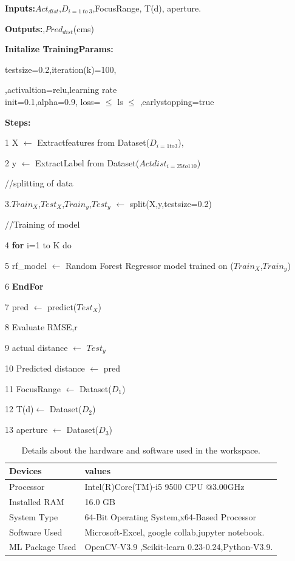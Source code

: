\documentclass[sn-mathphys]{sn-jnl}%
\theoremstyle{thmstyleone}%
\theoremstyle{thmstyletwo}%
\theoremstyle{thmstylethree}%
\begin{document}
\begin{algorithm}
\caption{Predict\textunderscore Distance\textunderscore from Tenengrad score .}
\label{alg:Alg2}
\textbf{Inputs:}$Act_{dist}$,$D_{i=1 \ to \ 3}$,Focus\textunderscore Range,
T(d), aperture. 

\textbf{Outputs:},$Pred_{dist}$(cms)

\textbf{Initalize TrainingParams:}

test\textunderscore size=0.2,iteration(k)=100,

,activaltion=relu,learning rate\textunderscore\\ init=0.1,alpha=0.9, loss= $\leq$ ls $\leq$ ,early\textunderscore stopping=true
 
\textbf{Steps:}

	1 X $\leftarrow$ Extract\textunderscore features \textunderscore  from \textunderscore Dataset($D_{i=1 to 3}$),
	
	2 y $\leftarrow$ Extract\textunderscore Label from \textunderscore Dataset($Actdist_{i=25 to 110}$) 
	
		//splitting of data
		
	3.$Train_{X}$,$Test_{X}$,$Train_{y}$,$Test_{y}$ $\leftarrow$ split(X,y,test\textunderscore size=0.2)

	//Training of model
	
	4 \textbf{for} i=1 to K do
	
	5 rf\_model $\leftarrow$ Random Forest Regressor model trained on ($Train_{X}$,$Train_{y}$)
	
	6 \textbf{EndFor}
	
	7 pred $\leftarrow$ predict($Test_{X}$)
	
	8 Evaluate  RMSE,r
	
	9 actual distance $\leftarrow$ $Test_{y}$
	
	10 Predicted distance $\leftarrow$ pred
	
	11 Focus\textunderscore Range $\leftarrow$ Dataset($D_{1}$)
	
	12 T(d)$\leftarrow$ Dataset($D_{2}$)
	
    13 aperture $\leftarrow$ Dataset($D_{3}$)
	\end{algorithm}
	
\begin{table}[t]
	\caption{Details about the hardware and software used in the workspace.}
	\label{tab:am8}
	  \centering
		 \begin{tabular} {|l l |}
		  \hline
		    Devices & values \\
		   \hline
		    Processor & Intel(R)Core(TM)-i5 9500 CPU @3.00GHz \\
		   \hline
		    Installed RAM & 16.0 GB \\
		   \hline
		    System Type & 64-Bit Operating System,x64-Based Processor\\
		   \hline
		    Software Used &  Microsoft-Excel, google collab,jupyter notebook.\\
		   \hline
		    ML Package Used & OpenCV-V3.9 ,Scikit-learn 0.23-0.24,Python-V3.9.\\
			 \hline
     \end{tabular}
	\end{table}
	
\end{document}
